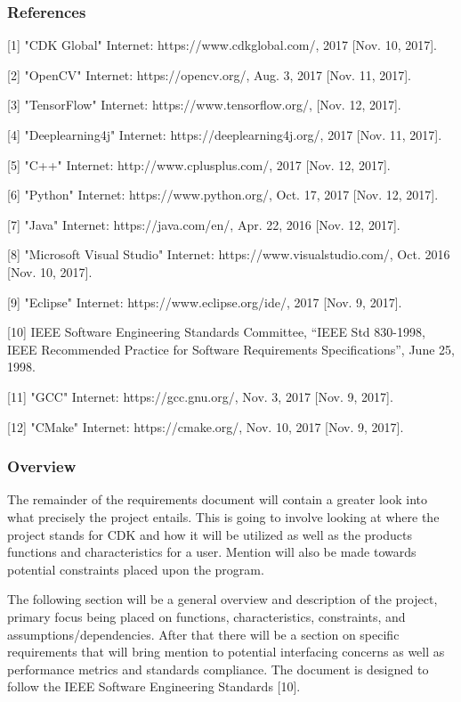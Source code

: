 \documentclass[article, onecolumn, draftclsnofoot,10pt, compsoc]{IEEEtran}
\begin{document}
\subsubsection{References}
[1] "CDK Global" Internet: https://www.cdkglobal.com/, 2017 [Nov. 10, 2017].

[2] "OpenCV" Internet: https://opencv.org/, Aug. 3, 2017 [Nov. 11, 2017].

[3] "TensorFlow" Internet: https://www.tensorflow.org/, [Nov. 12, 2017].

[4] "Deeplearning4j" Internet: https://deeplearning4j.org/, 2017 [Nov. 11, 2017].

[5] "C++" Internet: http://www.cplusplus.com/, 2017 [Nov. 12, 2017].

[6] "Python" Internet: https://www.python.org/, Oct. 17, 2017 [Nov. 12, 2017].

[7] "Java" Internet: https://java.com/en/, Apr. 22, 2016 [Nov. 12, 2017].

[8] "Microsoft Visual Studio" Internet: https://www.visualstudio.com/, Oct. 2016 [Nov. 10, 2017].

[9] "Eclipse" Internet: https://www.eclipse.org/ide/, 2017 [Nov. 9, 2017].

[10] IEEE Software Engineering Standards Committee, “IEEE Std 830-1998, IEEE Recommended Practice for Software Requirements Specifications”, June 25, 1998.

[11] "GCC" Internet: https://gcc.gnu.org/, Nov. 3, 2017 [Nov. 9, 2017].

[12] "CMake" Internet: https://cmake.org/, Nov. 10, 2017 [Nov. 9, 2017].

\subsubsection{Overview}
The remainder of the requirements document will contain a greater look into what precisely the project entails. This is going to involve looking at where the project stands for CDK and how it will be utilized as well as the products functions and characteristics for a user. Mention will also be made towards potential constraints placed upon the program.

The following section will be a general overview and description of the project, primary focus being placed on functions, characteristics, constraints, and assumptions/dependencies. After that there will be a section on specific requirements that will bring mention to potential interfacing concerns as well as performance metrics and standards compliance. The document is designed to follow the IEEE Software Engineering Standards [10].
\end{document}
